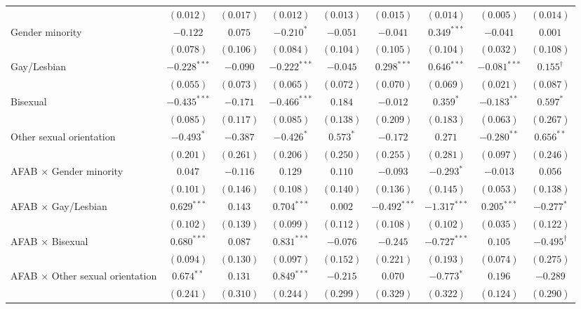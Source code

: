 \begin{table}[htpb]
{\begin{tabular}{l c c c c c c c c}
 & $(0.012)$ & $(0.017)$ & $(0.012)$ & $(0.013)$ & $(0.015)$ & $(0.014)$ & $(0.005)$ & $(0.014)$ \\
Gender minority & $-0.122$ & $0.075$ & $-0.210^{*}$ & $-0.051$ & $-0.041$ & $0.349^{***}$ & $-0.041$ & $0.001$ \\
 & $(0.078)$ & $(0.106)$ & $(0.084)$ & $(0.104)$ & $(0.105)$ & $(0.104)$ & $(0.032)$ & $(0.108)$ \\
Gay/Lesbian & $-0.228^{***}$ & $-0.090$ & $-0.222^{***}$ & $-0.045$ & $0.298^{***}$ & $0.646^{***}$ & $-0.081^{***}$ & $0.155^{\dagger}$ \\
 & $(0.055)$ & $(0.073)$ & $(0.065)$ & $(0.072)$ & $(0.070)$ & $(0.069)$ & $(0.021)$ & $(0.087)$ \\
Bisexual & $-0.435^{***}$ & $-0.171$ & $-0.466^{***}$ & $0.184$ & $-0.012$ & $0.359^{*}$ & $-0.183^{**}$ & $0.597^{*}$ \\
 & $(0.085)$ & $(0.117)$ & $(0.085)$ & $(0.138)$ & $(0.209)$ & $(0.183)$ & $(0.063)$ & $(0.267)$ \\
Other sexual orientation & $-0.493^{*}$ & $-0.387$ & $-0.426^{*}$ & $0.573^{*}$ & $-0.172$ & $0.271$ & $-0.280^{**}$ & $0.656^{**}$ \\
 & $(0.201)$ & $(0.261)$ & $(0.206)$ & $(0.250)$ & $(0.255)$ & $(0.281)$ & $(0.097)$ & $(0.246)$ \\
AFAB $\times$ Gender minority & $0.047$ & $-0.116$ & $0.129$ & $0.110$ & $-0.093$ & $-0.293^{*}$ & $-0.013$ & $0.056$ \\
 & $(0.101)$ & $(0.146)$ & $(0.108)$ & $(0.140)$ & $(0.136)$ & $(0.145)$ & $(0.053)$ & $(0.138)$ \\
AFAB $\times$ Gay/Lesbian & $0.629^{***}$ & $0.143$ & $0.704^{***}$ & $0.002$ & $-0.492^{***}$ & $-1.317^{***}$ & $0.205^{***}$ & $-0.277^{*}$ \\
 & $(0.102)$ & $(0.139)$ & $(0.099)$ & $(0.112)$ & $(0.108)$ & $(0.102)$ & $(0.035)$ & $(0.122)$ \\
AFAB $\times$ Bisexual & $0.680^{***}$ & $0.087$ & $0.831^{***}$ & $-0.076$ & $-0.245$ & $-0.727^{***}$ & $0.105$ & $-0.495^{\dagger}$ \\
 & $(0.094)$ & $(0.130)$ & $(0.097)$ & $(0.152)$ & $(0.221)$ & $(0.193)$ & $(0.074)$ & $(0.275)$ \\
AFAB $\times$ Other sexual orientation & $0.674^{**}$ & $0.131$ & $0.849^{***}$ & $-0.215$ & $0.070$ & $-0.773^{*}$ & $0.196$ & $-0.289$ \\
 & $(0.241)$ & $(0.310)$ & $(0.244)$ & $(0.299)$ & $(0.329)$ & $(0.322)$ & $(0.124)$ & $(0.290)$ \\

\end{tabular}}
\end{table}
